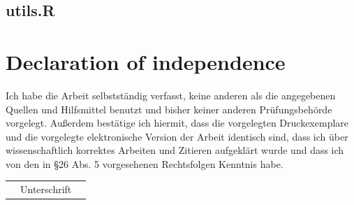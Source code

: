 \documentclass[12pt,twoside]{scrreport}
\begin{document}
\section*{utils.R}

\newpage

\chapter*{Declaration of independence}
Ich habe die Arbeit selbstständig verfasst, keine anderen als die angegebenen Quellen und Hilfsmittel benutzt und bisher keiner anderen Prüfungsbehörde vorgelegt. Außerdem bestätige ich hiermit, dass die vorgelegten Druckexemplare und die vorgelegte elektronische Version der Arbeit identisch sind, dass ich über wissenschaftlich korrektes Arbeiten und Zitieren aufgeklärt wurde und dass ich von den in §26 Abs. 5 vorgesehenen Rechtsfolgen Kenntnis habe.

\vspace{2cm}
\begin{flushright}
	\renewcommand{\arraystretch}{1.3}
	\begin{tabular}{ccc}
		\hline
		\hspace*{2cm}&Unterschrift&\hspace*{2cm}\\
	\end{tabular}
\end{flushright}


\end{document}
